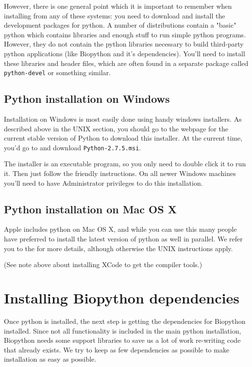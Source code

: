 \documentclass{article}
\begin{document}
However, there is one general point which it is important to remember
when installing from any of these systems: you need to download and
install the development packages for python. A number of distributions
contain a "basic" python which contains libraries and enough stuff to
run simple python programs. However, they do not contain the python
libraries necessary to build third-party python applications (like
Biopython and it's dependencies). You'll need to install these libraries
and header files, which are often found in a separate package called
\verb|python-devel| or something similar. 

\subsection{Python installation on Windows} 

Installation on Windows is most easily done using handy windows
installers. As described above in the UNIX section, you should go to the
webpage for the current stable version of Python to download this
installer. At the current time, you'd go to
 and download
\verb|Python-2.7.5.msi|. 

The installer is an executable program, so you only need to double click
it to run it. Then just follow the friendly instructions. On all newer Windows
machines you'll need to have Administrator privileges to do this
installation.

\subsection{Python installation on Mac OS X}

Apple includes python on Mac OS X, and while you can use this many people have
preferred to install the latest version of python as well in parallel. We refer
you to the  for more details, although
otherwise the UNIX instructions apply.

(See note above about installing XCode to get the compiler tools.)

\section{Installing Biopython dependencies}

Once python is installed, the next step is getting the dependencies
for Biopython installed. Since not all functionality is included in the
main python installation, Biopython needs some support libraries to save
us a lot of work re-writing code that already exists. We try to keep
as few dependencies as possible to make installation as easy as
possible.
\end{document}
